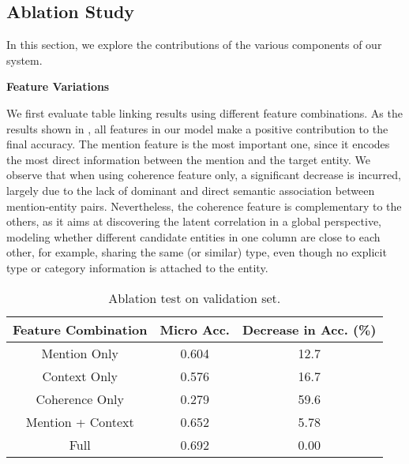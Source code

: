 \subsection{Ablation Study}
\label{sec:exp-ablation}

In this section, we explore the contributions of the various components of our system.

\noindent
\textbf{Feature Variations}

We first evaluate table linking results using different feature combinations.
As the results shown in ,
all features in our model make a positive contribution to the final accuracy.
The mention feature is the most important one, since it encodes
the most direct information between the mention and the target entity.
We observe that when using coherence feature only, a significant decrease is incurred,
largely due to the lack of dominant and direct semantic association between mention-entity pairs.
Nevertheless, the coherence feature is complementary to the others,
as it aims at discovering the latent correlation in a global perspective,
modeling whether different candidate entities in one column 
are close to each other, for example, sharing the same (or similar) type,
even though no explicit type or category information is attached to the entity.



\begin{table}[ht]
 	\small
	\centering
	\caption{Ablation test on validation set.}
	\label{tab:ablation-features}
	\begin{tabular} {c|c|c}
        \hline
		Feature Combination &   Micro Acc.  & Decrease in Acc. (\%) \\
		\hline
		Mention Only           &   0.604    & 12.7 \\
		Context Only        &   0.576    & 16.7   \\
		Coherence Only      &   0.279    & 59.6     \\
		Mention + Context      &   0.652    & 5.78    \\
		\hline
		Full                &   0.692    & 0.00  \\
        \hline
	\end{tabular}
\end{table}


